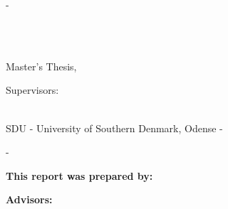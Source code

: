 \begin{titlingpage}
	\cleardoublepage

	\thispagestyle{empty}
	\enlargethispage{1.3cm}
	\calccentering{\unitlength}
	\begin{adjustwidth}{\unitlength-0.4cm}{-\unitlength-0.4cm}
		\begin{center}
			\vspace{1.5cm}
			{\Huge\scshape\ThAuthors}\\[2cm]
			\begin{Spacing}{3}
				{\sffamily\HUGE\textbf{\ThTitleEN}}\\[1cm]
				{\sffamily\LARGE{Master's Thesis, \ThEndDate}}\\[2cm]
			\end{Spacing}
			\vspace{\stretch{2}}
			\begin{Spacing}{1.5}
				{\Large Supervisors:}\\
				{\Large\ThSupervisors\\}
			\end{Spacing}
			\vspace{\stretch{3}}
			{\sffamily SDU - University of Southern Denmark, Odense - \ThYear}\\[1cm]
			\vspace{\stretch{4}}
		\end{center}
	\end{adjustwidth}

	\cleardoublepage
	\thispagestyle{empty}
	\calccentering{\unitlength}
	\begin{adjustwidth*}{\unitlength}{-\unitlength}
		\textbf{\ThTitleEN}
		\vspace{\stretch{1}}

		\noindent\textbf{This report was prepared by:}\\
		\ThAuthors


		\noindent\textbf{Advisors:}\\
		\ThSupervisors


		\noindent\ThDepartment




\end{adjustwidth*}
\end{titlingpage}
